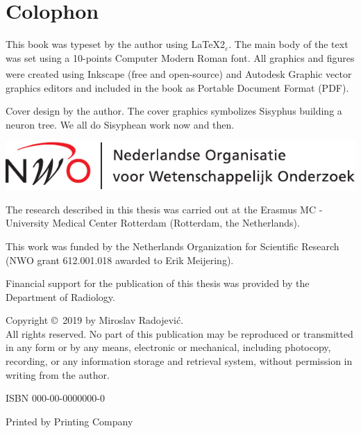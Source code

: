 %
%

\newpage
\setlength{\parindent}{0pt}
\thispagestyle{empty}

\section*{Colophon}

\bigskip
This book was typeset by the author using \LaTeX{}2{\LARGE $_{\varepsilon}$}. The main body of the text was set using a 10-points Computer Modern Roman font. All graphics and figures were created using Inkscape (free and open-source) and Autodesk \textsuperscript{\textregistered}Graphic vector graphics editors and included in the book as Portable Document Format (PDF). %

\bigskip
Cover design by the author. The cover graphics symbolizes Sisyphus building a neuron tree. We all do Sisyphean work now and then.

\vfill
\includegraphics[height=0.05\textheight]{./logos/nwo-nl}

The research described in this thesis was carried out at the Erasmus MC - University Medical Center Rotterdam (Rotterdam, the Netherlands). 

This work was funded by the Netherlands Organization for Scientific Research (NWO grant 612.001.018 awarded to Erik Meijering).
\bigskip

Financial support for the publication of this thesis was provided by the Department of Radiology.

\bigskip

Copyright \copyright\ 2019 by Miroslav Radojevi\'{c}.\\
All rights reserved. No part of this publication may be reproduced or transmitted in any form or by any means, electronic or mechanical, including photocopy, recording, or any information storage and retrieval system, without permission in writing from the author.

\bigskip
ISBN 000-00-0000000-0
\bigskip

Printed by Printing Company
\setlength{\parindent}{\myindent}

